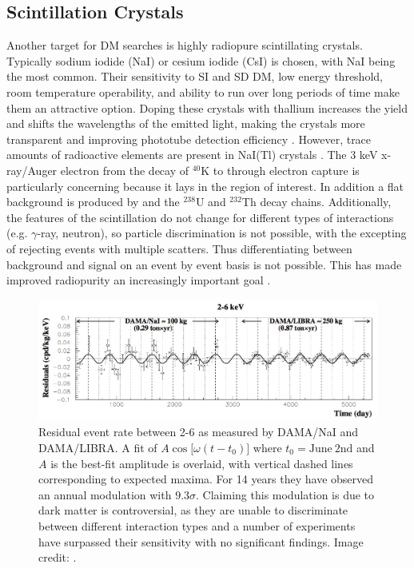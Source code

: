 \subsection{Scintillation Crystals}
\label{subsec:crystals}
Another target for DM searches is highly radiopure scintillating crystals.  Typically sodium iodide (NaI) or cesium iodide (CsI) is
chosen, with NaI being the most common.  Their sensitivity to SI
and SD DM, low energy threshold, room temperature operability, and ability to run over long periods of time
make them an attractive option.  Doping these crystals with thallium increases the yield and shifts the wavelengths of the emitted light,
making the crystals
more transparent and improving phototube detection efficiency .  However, trace amounts of radioactive elements
are present in NaI(Tl) crystals .  The 3 keV x-ray/Auger electron from the decay of
$^{40}$K to  through electron capture is particularly concerning because it lays in the region of interest.  In addition a
flat background is produced by  and the $^{238}$U and $^{232}$Th decay chains.  Additionally, the features of the
scintillation
do not change for different types of interactions (e.g. $\gamma$-ray, neutron), so particle discrimination is not possible, with the
excepting of rejecting events with multiple scatters.  Thus differentiating between background and signal on an event by event basis is
not possible.  This has made improved radiopurity an increasingly important goal .

\begin{figure}
\centering
\includegraphics[width=\textwidth]{DAMAModulation}
\caption[Residual event rate between 2-6 \kevee as measured by DAMA/NaI and DAMA/LIBRA.  A fit of
$A \cos \lbrack \omega (t - t_{0}) \rbrack $ where $t_{0} = \mathrm{June\ 2nd}$ and $A$ is the best-fit amplitude is overlaid, with vertical
dashed lines corresponding to expected
maxima.]{Residual event rate between 2-6 \kevee as measured by DAMA/NaI and DAMA/LIBRA.  A fit of $A \cos \lbrack \omega (t - t_{0}) \rbrack$
where
$t_{0} = \mathrm{June\ 2nd}$ and $A$ is the best-fit amplitude is overlaid, with vertical dashed lines corresponding to expected
maxima.  For 14 years they have observed an annual
modulation with $9.3\sigma$.  Claiming this modulation is due to dark matter is controversial, as they are unable to
discriminate between different interaction types and a number of experiments have surpassed their sensitivity with no significant
findings.  Image credit: .}
\label{fig:dama}
\end{figure}


